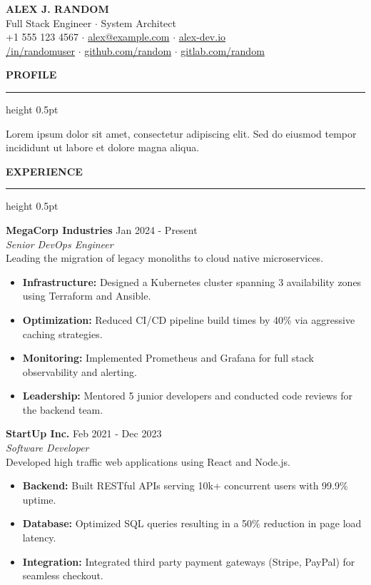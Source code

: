 \documentclass[11pt,a4paper]{article}
\newcommand{\cvsection}[1]{
    \vspace{0.4cm} 
    \noindent
    {\color{mainblack}\textbf{\large \MakeUppercase{#1}}}
    \par
    \vspace{0.1cm}
    {\color{mainblack}\hrule height 0.5pt}
    \vspace{0.2cm} 
}
\newcommand{\jobtitle}[2]{
    \noindent
    \textbf{#1} \hfill {\footnotesize \color{darkgray} #2} \\ 
}
\begin{document}
\noindent
{\fontsize{24}{28}\selectfont \textbf{\MakeUppercase{Alex J. Random}}} \\[0.2cm]
{\color{darkgray}
Full Stack Engineer $\cdot$ System Architect \\
 +1 555 123 4567  $\cdot$ \href{mailto:alex@example.com}{alex@example.com}  $\cdot$ \href{https://example.com}{alex-dev.io} \\
\href{https://linkedin.com}{/in/randomuser} $\cdot$ \href{https://github.com}{github.com/random} $\cdot$ \href{https://gitlab.com}{gitlab.com/random}
}

\cvsection{Profile}
Lorem ipsum dolor sit amet, consectetur adipiscing elit. Sed do eiusmod tempor incididunt ut labore et dolore magna aliqua. 

\cvsection{Experience}

\jobtitle{MegaCorp Industries}{Jan 2024 - Present}
\textit{Senior DevOps Engineer} \\
Leading the migration of legacy monoliths to cloud native microservices.
\begin{itemize}[leftmargin=*, label={\small\textbullet}, itemsep=0pt, topsep=2pt]
    \item \textbf{Infrastructure:} Designed a Kubernetes cluster spanning 3 availability zones using Terraform and Ansible.
    \item \textbf{Optimization:} Reduced CI/CD pipeline build times by 40\% via aggressive caching strategies.
    \item \textbf{Monitoring:} Implemented Prometheus and Grafana for full stack observability and alerting.
    \item \textbf{Leadership:} Mentored 5 junior developers and conducted code reviews for the backend team.
\end{itemize}

\jobtitle{StartUp Inc.}{Feb 2021 - Dec 2023}
\textit{Software Developer} \\
Developed high traffic web applications using React and Node.js.
\begin{itemize}[leftmargin=*, label={\small\textbullet}, itemsep=0pt, topsep=2pt]
    \item \textbf{Backend:} Built RESTful APIs serving 10k+ concurrent users with 99.9\% uptime.
    \item \textbf{Database:} Optimized SQL queries resulting in a 50\% reduction in page load latency.
    \item \textbf{Integration:} Integrated third party payment gateways (Stripe, PayPal) for seamless checkout.
\end{itemize}
\end{document}
